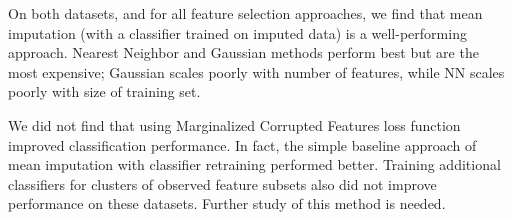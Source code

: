 On both datasets, and for all feature selection approaches, we find that mean imputation (with a classifier trained on imputed data) is a well-performing approach.
Nearest Neighbor and Gaussian methods perform best but are the most expensive; Gaussian scales poorly with number of features, while NN scales poorly with size of training set.

We did not find that using Marginalized Corrupted Features loss function improved classification performance.
In fact, the simple baseline approach of mean imputation with classifier retraining performed better.
Training additional classifiers for clusters of observed feature subsets also did not improve performance on these datasets.
Further study of this method is needed.
